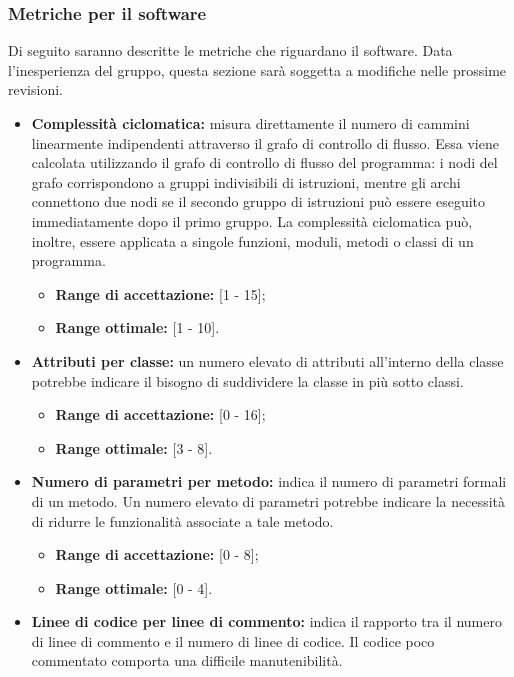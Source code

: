 \subsubsection{Metriche per il software}
\label{sezione 3.9}
Di seguito saranno descritte le metriche che riguardano il software. Data l'inesperienza del gruppo, questa sezione sarà soggetta a modifiche nelle prossime revisioni.
\begin{itemize}
	\item \textbf{Complessità ciclomatica:} misura direttamente il numero di cammini linearmente indipendenti attraverso il grafo di controllo di flusso. Essa viene calcolata utilizzando il grafo di controllo di flusso del programma: i nodi del grafo corrispondono a gruppi indivisibili di istruzioni, mentre gli archi connettono due nodi se il secondo gruppo di istruzioni può essere eseguito immediatamente dopo il primo gruppo. La complessità ciclomatica può, inoltre, essere applicata a singole funzioni, moduli, metodi o classi di un programma.
	\begin{itemize}
		\item \textbf{Range di accettazione:} [1 - 15];
		\item \textbf{Range ottimale:} [1 - 10].
	\end{itemize}
	\item \textbf{Attributi per classe:} un numero elevato di attributi all'interno della classe potrebbe indicare il bisogno di suddividere la classe in più sotto classi.
	\begin{itemize}
		\item \textbf{Range di accettazione:} [0 - 16];
		\item \textbf{Range ottimale:} [3 - 8].
	\end{itemize}
	\item \textbf{Numero di parametri per metodo:} indica il numero di parametri formali di un metodo. Un numero elevato di parametri potrebbe indicare la necessità di ridurre le funzionalità associate a tale metodo.
	\begin{itemize}
		\item \textbf{Range di accettazione:} [0 - 8];
		\item \textbf{Range ottimale:} [0 - 4].
	\end{itemize}
	\item \textbf{Linee di codice per linee di commento:} indica il rapporto tra il numero di linee di commento e il numero di linee di codice. Il codice poco commentato comporta una difficile manutenibilità.
	\begin{itemize}

\end{itemize}
\end{itemize}
